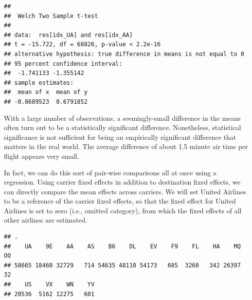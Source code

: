 \documentclass[]{book}
\newenvironment{Shaded}{\begin{snugshade}}{\end{snugshade}}
\newcommand{\KeywordTok}[1]{\textcolor[rgb]{0.13,0.29,0.53}{\textbf{{#1}}}}
\newcommand{\DataTypeTok}[1]{\textcolor[rgb]{0.13,0.29,0.53}{{#1}}}
\newcommand{\StringTok}[1]{\textcolor[rgb]{0.31,0.60,0.02}{{#1}}}
\newcommand{\CommentTok}[1]{\textcolor[rgb]{0.56,0.35,0.01}{\textit{{#1}}}}
\newcommand{\NormalTok}[1]{{#1}}
\theoremstyle{definition}
\theoremstyle{definition}
\theoremstyle{remark}
\begin{document}
\begin{Shaded}
\end{Shaded}

\begin{verbatim}
## 
##  Welch Two Sample t-test
## 
## data:  res[idx_UA] and res[idx_AA]
## t = -15.722, df = 68826, p-value < 2.2e-16
## alternative hypothesis: true difference in means is not equal to 0
## 95 percent confidence interval:
##  -1.741133 -1.355142
## sample estimates:
##  mean of x  mean of y 
## -0.8689523  0.6791852
\end{verbatim}

With a large number of observations, a seemingly-small difference in the
means often turn out to be a statistically significant difference.
Nonetheless, statistical significance is not sufficient for being an
empirically significant difference that matters in the real world. The
average difference of about 1.5 minute air time per flight appears very
small.

In fact, we can do this sort of pair-wise comparisons all at once using
a regression. Using carrier fixed effects in addition to destination
fixed effects, we can directly compare the mean effects across carriers.
We will set United Airlines to be a reference of the carrier fixed
effects, so that the fixed effect for United Airlines is set to zero
(i.e., omitted category), from which the fixed effects of all other
airlines are estimated.

\begin{Shaded}
\end{Shaded}

\begin{verbatim}
## .
##    UA    9E    AA    AS    B6    DL    EV    F9    FL    HA    MQ    OO 
## 58665 18460 32729   714 54635 48110 54173   685  3260   342 26397    32 
##    US    VX    WN    YV 
## 20536  5162 12275   601
\end{verbatim}
\end{document}
